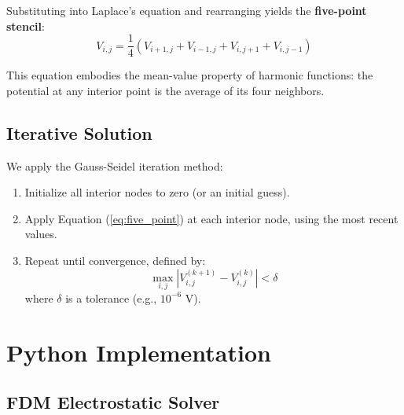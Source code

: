 \documentclass[12pt,a4paper]{report}
\begin{document}
Substituting into Laplace's equation and rearranging yields the \textbf{five-point stencil}:
\begin{equation}
    \boxed{V_{i,j} = \frac{1}{4}\left(V_{i+1,j} + V_{i-1,j} + V_{i,j+1} + V_{i,j-1}\right)}
    \label{eq:five_point}
\end{equation}

This equation embodies the mean-value property of harmonic functions: the potential at any interior point is the average of its four neighbors.

\subsection{Iterative Solution}

We apply the Gauss-Seidel iteration method:
\begin{enumerate}
    \item Initialize all interior nodes to zero (or an initial guess).
    \item Apply Equation (\ref{eq:five_point}) at each interior node, using the most recent values.
    \item Repeat until convergence, defined by:
    \begin{equation}
        \max_{i,j} |V_{i,j}^{(k+1)} - V_{i,j}^{(k)}| < \delta
        \label{eq:convergence}
    \end{equation}
    where $\delta$ is a tolerance (e.g., $10^{-6}$ V).
\end{enumerate}

\section{Python Implementation}

\subsection{FDM Electrostatic Solver}
\end{document}
